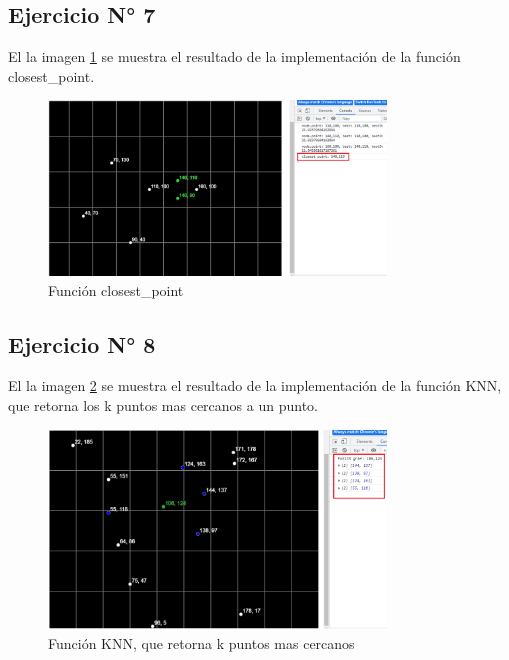 \documentclass{article}
\begin{document}
\subsection{Ejercicio N° 7}
El la imagen \ref{fig:ejercicio_07} se muestra el resultado de la implementación de la función closest_point.
\begin{figure}[h!]
	\centering
	\includegraphics[width=0.8\textwidth]{img/ejercicio_07.png}
	\caption{Función closest_point}
	\label{fig:ejercicio_07}
\end{figure}


\subsection{Ejercicio N° 8}
El la imagen \ref{fig:ejercicio_08} se muestra el resultado de la implementación de la función KNN, que retorna los k puntos mas cercanos a un punto.
\begin{figure}[h!]
	\centering
	\includegraphics[width=0.8\textwidth]{img/ejercicio_08.png}
	\caption{Función KNN, que retorna k puntos mas cercanos}
	\label{fig:ejercicio_08}
\end{figure}
\end{document}
